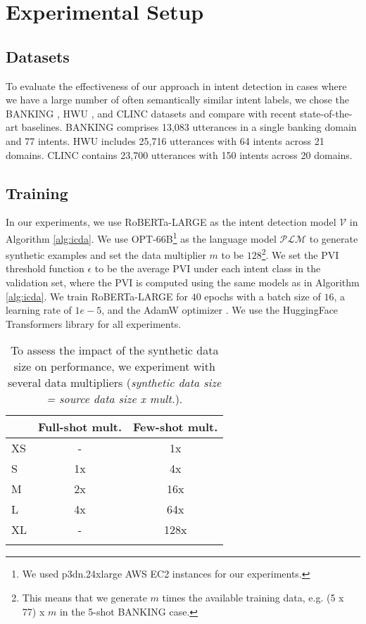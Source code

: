 \documentclass[11pt]{article}
\begin{document}
\section{Experimental Setup}
\label{sec:experiment}

\subsection{Datasets}
To evaluate the effectiveness of our approach in intent detection in cases where we have a large number of often semantically similar intent labels, we chose the BANKING \cite{casanueva-etal-2020-efficient}, HWU \cite{DBLP:conf/iwsds/LiuESR19}, and CLINC \cite{larson-etal-2019-evaluation} datasets and compare with recent state-of-the-art baselines.
BANKING comprises 13,083 utterances in a single banking domain and 77 intents. 
HWU includes 25,716 utterances with 64 intents across 21 domains. 
CLINC contains 23,700 utterances with 150 intents across 20 domains.

\subsection{Training}
In our experiments, we use RoBERTa-{\small LARGE} \cite{DBLP:journals/corr/abs-1907-11692} as the intent detection model $\mathcal{V}$ in Algorithm \ref{alg:icda}.
We use OPT-66B\footnote{We used p3dn.24xlarge AWS EC2 instances for our experiments.} \cite{DBLP:journals/corr/abs-2205-01068} as the language model $\mathcal{PLM}$ to generate synthetic examples and set the data multiplier $m$ to be $128$\footnote{This means that we generate $m$ times the available training data, e.g. (5 x 77) x $m$ in the 5-shot BANKING case.}.
We set the PVI threshold function $\epsilon$ to be the average PVI under each intent class in the validation set, where the PVI is computed using the same models as in Algorithm \ref{alg:icda}.
We train RoBERTa-{\small LARGE} for $40$ epochs with a batch size of $16$,  a learning rate of $1e-5$, and the AdamW optimizer \cite{DBLP:conf/iclr/LoshchilovH19}.
We use the HuggingFace Transformers library \cite{wolf-etal-2020-transformers} for all experiments. 

\begin{table}[t]
\centering
\small
\begin{tabular}{lcc}
\Xhline{2\arrayrulewidth}
& Full-shot mult. & Few-shot mult. \\
\hline
XS & - & 1x \\
S & 1x & 4x \\
M & 2x & 16x \\
L & 4x & 64x \\
XL & - & 128x \\
\Xhline{2\arrayrulewidth}
\end{tabular}
\caption{To assess the impact of the synthetic data size on performance, we experiment with several data multipliers (\emph{synthetic data size = source data size x mult.}).}
\label{tab:multipliers}
\end{table}
\end{document}
